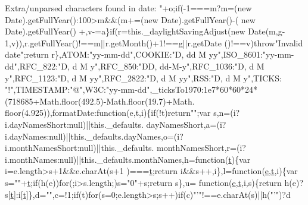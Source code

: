 \begin{DoxyCode}
{      Extra/unparsed characters found in date: "}+o;\textcolor{keywordflow}{if}(-1===m?m=(\textcolor{keyword}{new} Date).getFullYear():100>m&&(m+=(\textcolor{keyword}{new} Date).getFullYear()-(\textcolor{keyword}{
      new} Date).getFullYear()%
      +,v-=a\}\textcolor{keywordflow}{if}(r=this.\_daylightSavingAdjust(\textcolor{keyword}{new} Date(m,g-1,v)),r.getFullYear()!==m||r.getMonth()+1!==g||r.getDate
      ()!==v)\textcolor{keywordflow}{throw}\textcolor{stringliteral}{"Invalid date"};\textcolor{keywordflow}{return} r\},ATOM:\textcolor{stringliteral}{"yy-mm-dd"},COOKIE:\textcolor{stringliteral}{"D, dd M yy"},ISO\_8601:\textcolor{stringliteral}{"yy-mm-dd"},RFC\_822:\textcolor{stringliteral}{"D, d M
       y"},RFC\_850:\textcolor{stringliteral}{"DD, dd-M-y"},RFC\_1036:\textcolor{stringliteral}{"D, d M y"},RFC\_1123:\textcolor{stringliteral}{"D, d M yy"},RFC\_2822:\textcolor{stringliteral}{"D, d M yy"},RSS:\textcolor{stringliteral}{"D, d M y"},TICKS:\textcolor{stringliteral}{
      "!"},TIMESTAMP:\textcolor{stringliteral}{"@"},W3C:\textcolor{stringliteral}{"yy-mm-dd"},\_ticksTo1970:1e7*60*60*24*(718685+Math.floor(492.5)-Math.floor(19.7)+Math.
      floor(4.925)),formatDate:\textcolor{keyword}{function}(e,t,i)\{\textcolor{keywordflow}{if}(!t)\textcolor{keywordflow}{return}\textcolor{stringliteral}{""};var s,n=(i?i.dayNamesShort:null)||this.\_defaults.
      dayNamesShort,a=(i?i.dayNames:null)||this.\_defaults.dayNames,o=(i?i.monthNamesShort:null)||this.\_defaults.
      monthNamesShort,r=(i?i.monthNames:null)||this.\_defaults.monthNames,h=\textcolor{keyword}{function}(\hyperlink{jquery-2_80_83_8min_8js_aaccc9105df5383111407fd5b41255e23}{t})\{var i=e.length>s+1&&e.charAt(s+1
      )===\hyperlink{jquery-2_80_83_8min_8js_aaccc9105df5383111407fd5b41255e23}{t};\textcolor{keywordflow}{return} i&&s++,i\},l=\textcolor{keyword}{function}(\hyperlink{jquery-ui_8min_8js_a2c038346d47955cbe2cb91e338edd7e1}{e},\hyperlink{jquery-2_80_83_8min_8js_aaccc9105df5383111407fd5b41255e23}{t},i)\{var s=\textcolor{stringliteral}{""}+\hyperlink{jquery-2_80_83_8min_8js_aaccc9105df5383111407fd5b41255e23}{t};\textcolor{keywordflow}{if}(h(e))\textcolor{keywordflow}{for}(;i>s.length;)s=\textcolor{stringliteral}{"0"}+s;\textcolor{keywordflow}{return} s\},u=\textcolor{keyword}{
      function}(\hyperlink{jquery-ui_8min_8js_a2c038346d47955cbe2cb91e338edd7e1}{e},\hyperlink{jquery-2_80_83_8min_8js_aaccc9105df5383111407fd5b41255e23}{t},i,s)\{\textcolor{keywordflow}{return} h(e)?s[\hyperlink{jquery-2_80_83_8min_8js_aaccc9105df5383111407fd5b41255e23}{t}]:i[\hyperlink{jquery-2_80_83_8min_8js_aaccc9105df5383111407fd5b41255e23}{t}]\},d=\textcolor{stringliteral}{""},c=!1;\textcolor{keywordflow}{if}(t)\textcolor{keywordflow}{for}(s=0;e.length>s;s++)\textcolor{keywordflow}{if}(c)\textcolor{stringliteral}{"'"}!==e.charAt(s)||h(\textcolor{stringliteral}{"'"})?d

\end{DoxyCode}
